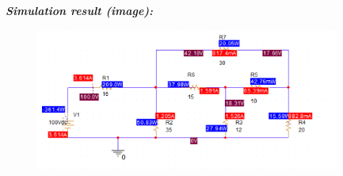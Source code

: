 \bigskip
\textit{\textbf{Simulation result (image):}}
\begin{figure}[H]
    \centering
    \includegraphics[width = 10cm]{source/picture/bai_1/ex10_sim.png}
\end{figure}




